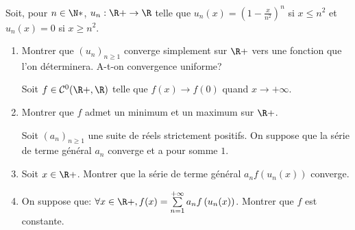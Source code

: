 \begin{enonce}
\begin{exercise}[ID={RMS 125 E377, 2014 XENS PSI},subtitle={2014 X-ENS PSI},tags={}, difficulty={0}]
Soit, pour $n\in\N*$, $u_n:\R+\to\R$ telle que
$u_n(x)=\left( 1-\frac{x}{n^2} \right)^n$ si $x\leq n^2$
et $u_n(x)=0$ si $x\geq n^2$.
\begin{enumerate}
  \item Montrer que $\left( u_n \right)_{n\geq 1}$ converge simplement sur $\R+$ vers une fonction que l'on déterminera.
    A-t-on convergence uniforme?

    Soit $f\in\mathcal{C}^0(\R+,\R)$ telle que $f(x)\to f(0)$ quand $x\to+\infty$.

  \item Montrer que $f$ admet un minimum et un maximum sur $\R+$.

    Soit $\left( a_n \right)_{n\geq1}$ une suite de réels strictement positifs.
    On suppose que la série de terme général $a_n$ converge et a pour somme $1$.

  \item Soit $x\in\R+$.
    Montrer que la série de terme général $a_n f\left( u_n(x) \right)$ converge.

  \item On suppose que: $\forall x\in\R+, f(x)=\sum\limits_{n=1}^{+\infty} a_n f\left( u_n(x) \right)$.
    Montrer que $f$ est constante.
\end{enumerate}
\end{exercise}
\begin{solution}
\end{solution}
\end{enonce}

